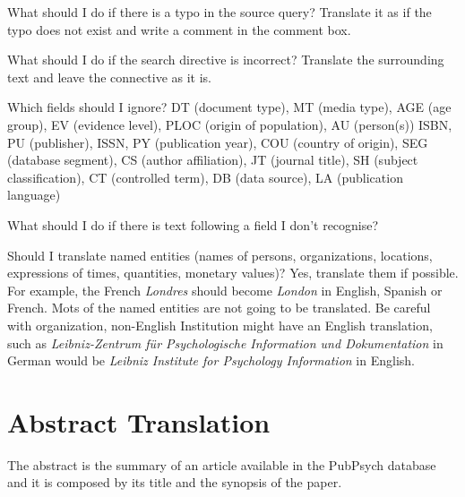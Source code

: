 \documentclass[a4paper,10pt]{article}
\newenvironment{faq}{\begin{description}[style=nextline]}{\end{description}}
\newcommand{\cris}[1]{{\color{red}{#1}}}
\begin{document}
\begin{faq}

  \item[What should I do if there is a typo in the source query?]
    Translate it as if the typo does not exist and write a comment in the comment box.

  \item[What should I do if the search directive is incorrect?]
    Translate the surrounding text and leave the connective as it is.
    
  \item[Which fields should I ignore?]
  DT (document type), MT (media type), AGE (age group), EV (evidence level), PLOC (origin of population), AU (person(s))
  ISBN, PU (publisher), ISSN, PY (publication year), COU (country of origin), SEG (database segment), CS (author affiliation), JT (journal title), SH (subject classification), CT (controlled term), DB (data source), LA (publication language)
  
  \item[What should I do if there is text following a field I don't recognise?]
    \cris{Ignore that text?}
    
  \item[Should I translate named entities (names of persons, organizations, locations, expressions of times, quantities, monetary values)?]
    Yes, translate them if possible. For example, the French \textit{Londres} should become \textit{London} in English, Spanish or French. Mots of the named entities are not going to be translated. Be careful with organization, non-English Institution might have an English translation, such as \textit{Leibniz-Zentrum f\"ur Psychologische Information und Dokumentation} in German would be \textit{Leibniz Institute for Psychology Information} in English. \cris{not sure which language to choose for a French or Spanish text}
    
\end{faq}



\section{Abstract Translation}
\label{s:abstracts}


The abstract is the summary of an article available in the PubPsych database and it is composed by its title and the synopsis of the paper. 
\end{document}
